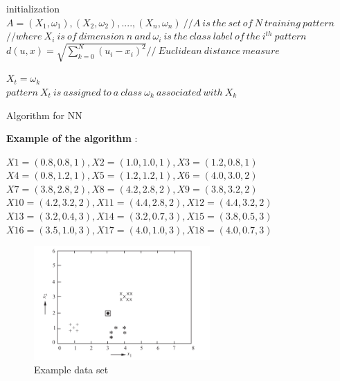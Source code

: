 \begin{algorithm}[H]
\SetAlgoLined

 initialization\;
 $ A=(X_{1},\omega_{1}),(X_{2},\omega_{2}),....,(X_{n},\omega_{n}) \ // A\ is\ the\ set\ of\ N\ training\ pattern $\\
 
 
$ //where\  X_{i}\ is\ of\ dimension\ n\ and\  \omega_{i}\ is\ the\ class\ label\ of\ the\ i^{th}\ pattern $\\
 
 
 $d(u,x) = \sqrt{\sum_{k=0}^{N} (u_{i}-x_{i})^{2}}  // \ Euclidean\ distance\ measure $\\ 

 
 $ X_{t} = \omega_{k} $ \\
 
 $ pattern\ X_{t}\ is\ assigned\ to\ a\ class\ \omega_{k}\ associated\ with\  X_{k} $
 
 \caption{Algorithm for NN}
\end{algorithm}



\textbf{Example of the algorithm} :


$ X1 = (0.8, 0.8, 1), X2 = (1.0, 1.0, 1), X3 = (1.2, 0.8, 1)$\\
$X4 = (0.8, 1.2, 1), X5 = (1.2, 1.2, 1), X6 = (4.0, 3.0, 2)$\\
$X7 = (3.8, 2.8, 2), X8 = (4.2, 2.8, 2), X9 = (3.8, 3.2, 2)$\\
$X10 = (4.2, 3.2, 2), X11 = (4.4, 2.8, 2), X12 = (4.4, 3.2, 2)$\\
$X13 = (3.2, 0.4, 3), X14 = (3.2, 0.7, 3), X15 = (3.8, 0.5, 3)$\\
$X16 = (3.5, 1.0, 3), X17 = (4.0, 1.0, 3), X18 = (4.0, 0.7, 3)$

\begin{figure}[H]
\centering
\includegraphics[width=0.6\textwidth]{img/nn-example.PNG}
\caption{ Example data set }
\label{fig:NN}
\end{figure}

